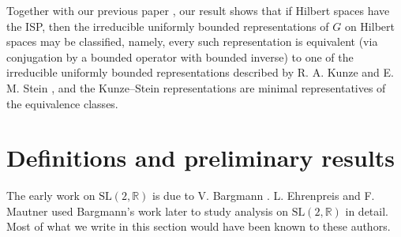 \documentclass[12pt,a4paper]{amsart}
\theoremstyle{definition}
\theoremstyle{remark}
\numberwithin{equation}{section}
\newcommand{\R}{\mathbb{R}}
\begin{document}
Together with our previous paper \cite{ACD}, our result shows that if Hilbert spaces have the ISP, then the irreducible uniformly bounded representations of $G$ on Hilbert spaces may be classified, namely, every such representation is equivalent (via conjugation by a bounded operator with bounded inverse) to one of the irreducible uniformly bounded representations described by R. A. Kunze and E. M. Stein \cite{KS60}, and the Kunze--Stein representations are minimal representatives of the equivalence classes.





\section{Definitions and preliminary results}\label{sec:def-prelim}

The early work on $\mathrm{SL}(2,\R)$ is due to V. Bargmann \cite{B}. 
L. Ehrenpreis and F. Mautner \cite{EMI, EMII, EMIII} used Bargmann's work later to study analysis on $\mathrm{SL}(2,\R)$ in detail.
Most of what we write in this section would have been known to these authors.
\end{document}
